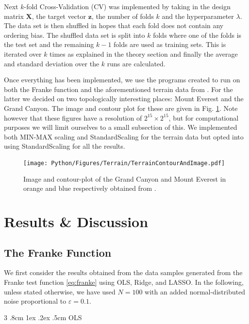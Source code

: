 \documentclass[%
reprint,
amsmath,amssymb,
aps,
pra,
]{revtex4-2}
\makeatletter
\renewcommand{\subsubsection}{%
	\@startsection
	{subsubsection}%
	{3}%
	{\z@}%
	{.8cm \@plus1ex \@minus .2ex}%
	{.5cm}%
	{\normalfont\small\centering}%
}
\makeatother
\begin{document}
Next $k$-fold Cross-Validation (CV) was implemented by taking in the design matrix $\bm X$, the target vector $\bm z$, the number of folds $k$ and the hyperparameter $\lambda$. The data set is then shuffled in hopes that each fold does not contain any ordering bias. The shuffled data set is split into $k$ folds where one of the folds is the test set and the remaining $k-1$ folds are used as training sets. This is iterated over $k$ times as explained in the theory section and finally the average and standard deviation over the $k$ runs are calculated.

Once everything has been implemented, we use the programs created to run on both the Franke function and the aforementioned terrain data from \cite{USGS_EarthExplorer}. For the latter we decided on two topologically interesting places: Mount Everest and the Grand Canyon. The image and contour plot for these are given in Fig. \ref{fig:GC_ME_Image_Contour}. Note however that these figures have a resolution of $2^{15}\times 2^{15}$, but for computational purposes we will limit ourselves to a small subsection of this. We implemented both MIN-MAX scaling and StandardScaling for the terrain data but opted into using StandardScaling for all the results.
\begin{figure}
	\texttt{[image: Python/Figures/Terrain/TerrainContourAndImage.pdf]}
	\caption{Image and contour-plot of the Grand Canyon and Mount Everest in orange and blue respectively obtained from \cite{USGS_EarthExplorer}.}
	\label{fig:GC_ME_Image_Contour}
\end{figure}

\section{Results \& Discussion}

\subsection{The Franke Function}
We first consider the results obtained from the data samples generated from the Franke test function \eqref{eq:franke} using OLS, Ridge, and LASSO. In the following, unless stated otherwise, we have used $N=100$ with an added normal-distributed noise proportional to \(\varepsilon=0.1\).
\subsubsection{OLS}
\end{document}
